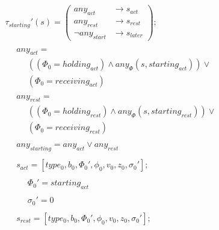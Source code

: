 \documentclass{acm_proc_article-sp}
\begin{document}
\begin{displaymath} \begin{array}{l}
\tau_{starting}'(s) = \left( \begin{array}{ll} any_{act}        & \rightarrow s_{act} \\
                                               any_{rest}       & \rightarrow s_{rest} \\
                                               \neg any_{start} & \rightarrow s_{later} \end{array} \right); \\
\\
\hspace{16pt} any_{act} = \\
\hspace{16pt} \hspace{16pt} ((\Phi_0 = holding_{act}) \wedge any_\Phi(s, starting_{act})) \vee \\
\hspace{16pt} \hspace{16pt} (\Phi_0 = receiving_{act}) \\
\\
\hspace{16pt} any_{rest} = \\
\hspace{16pt} \hspace{16pt} ((\Phi_0 = holding_{rest}) \wedge any_\Phi(s, starting_{rest})) \vee \\
\hspace{16pt} \hspace{16pt} (\Phi_0 = receiving_{rest}) \\
\\
\hspace{16pt} any_{starting} = any_{act} \vee any_{rest} \\
\\
\hspace{16pt} s_{act} = [type_0, b_0, \Phi_0', \phi_0, v_0, z_0, \sigma_0']; \\
\\
\hspace{16pt} \hspace{16pt} \Phi_0' = starting_{act} \\
\\
\hspace{16pt} \hspace{16pt} \sigma_0' = 0 \\
\\
\hspace{16pt} s_{rest} = [type_0, b_0, \Phi_0', \phi_0, v_0, z_0, \sigma_0']; \\

\end{array}
\end{displaymath}
\end{document}
